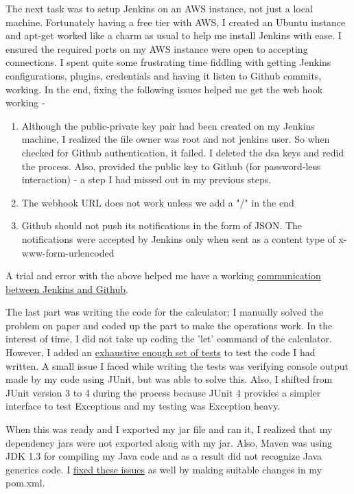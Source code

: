 \documentclass[12pt]{article}
\begin{document}
The next task was to setup Jenkins on an AWS instance, not just a local machine. Fortunately having a free tier with AWS, I created an Ubuntu instance and apt-get worked like a charm as usual to help me install Jenkins with ease. I ensured the required ports on my AWS instance were open to accepting connections. I spent quite some frustrating time fiddling with getting Jenkins configurations, plugins, credentials and having it listen to Github commits, working. In the end, fixing the following issues helped me get the web hook working - 
\begin{enumerate}
\item Although the public-private key pair had been created on my Jenkins machine, I realized the file owner was root and not jenkins user. So when checked for Github authentication, it failed. I deleted the dsa keys and redid the process. Also, provided the public key to Github (for password-less interaction) - a step I had missed out in my previous steps. 
\item The webhook URL does not work unless we add a "/" in the end
\item Github should not push its notifications in the form of JSON. The notifications were accepted by Jenkins only when sent as a content type of x-www-form-urlencoded
\end{enumerate} 
A trial and error with the above helped me have a working \href{https://github.com/rhcode/simple-calculator/commit/de9bc5ef8d15ee4ec3c4d3acf339730b4bc10001}{communication between Jenkins and Github}. 

The last part was writing the code for the calculator; I manually solved the problem on paper and coded up the part to make the operations work. In the interest of time, I did not take up coding the 'let' command of the calculator. However, I added an \href{https://github.com/rhcode/simple-calculator/commit/3120462c250605027a37f1846a04dc5f4527a048}{exhaustive enough set of tests} to test the code I had written. A small issue I faced while writing the tests was verifying console output made by my code using JUnit, but was able to solve this. Also, I shifted from JUnit version 3 to 4 during the process because JUnit 4 provides a simpler interface to test Exceptions and my testing was Exception heavy. 

When this was ready and I exported my jar file and ran it, I realized that my dependency jars were not exported along with my jar. Also, Maven was using JDK 1.3 for compiling my Java code and as a result did not recognize Java generics code. I \href{https://github.com/rhcode/simple-calculator/commit/3d6b592d51bc128b27e64d7ec45cbf9d3f52a4b0}{fixed these issues} as well by making suitable changes in my pom.xml. 
\end{document}
